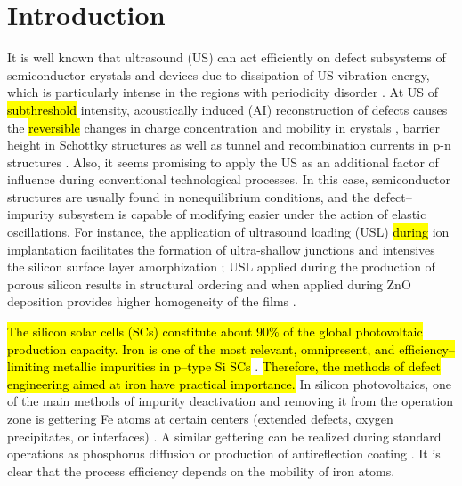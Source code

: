 \documentclass[sn-mathphys]{sn-jnl}%
\theoremstyle{thmstyleone}%
\theoremstyle{thmstyletwo}%
\theoremstyle{thmstylethree}%
\begin{document}



\maketitle

\section{Introduction}\label{sec1}

It is well known that ultrasound (US) can act efficiently on defect subsystems of semiconductor crystals and devices due to dissipation of US vibration energy, which is particularly intense in the regions with periodicity disorder \cite{ostapenko2002,Savkina2013,Olikh2018JAP}.
At US of \hl{subthreshold} intensity, acoustically induced (AI) reconstruction of defects causes the \hl{reversible} changes in charge concentration and mobility in crystals \cite{Davletova2008,Olikh2020JEM},
barrier height in Schottky structures \cite{Olikh:Ultras,OlikhJAP}
as well as tunnel and recombination currents in p-n structures \cite{Teterkin2009,Olikh2018JAP}.
Also, it seems promising to apply the US as an additional factor of influence during conventional technological processes.
In this case, semiconductor structures are usually found in  nonequilibrium conditions, and the defect--impurity subsystem is capable of modifying easier under the action of elastic oscillations.
For instance, the application of ultrasound loading (USL) \hl{during}  ion implantation facilitates
the formation of ultra-shallow junctions \cite{USImplant:JVacSci}
and intensives the silicon surface layer amorphization \cite{RomanyukSST};
USL applied during the production of porous silicon  results in structural ordering \cite{Kalem2000}
and when applied during ZnO deposition provides higher homogeneity of the films \cite{US:ZnOfilm}.

\hl{ The silicon solar cells (SCs) constitute about 90\% of the global photovoltaic production capacity.
Iron is one of the most relevant, omnipresent, and efficiency--limiting metallic impurities
in p--type Si SCs} \cite{Istratov1999,IronSC}.
\hl{ Therefore, the methods of defect engineering aimed at iron have practical importance.}
In silicon photovoltaics, one of the main methods of impurity deactivation and removing it from the operation zone is gettering Fe atoms at certain centers (extended defects, oxygen precipitates, or interfaces) \cite{LaineIEEEPV2016}.
A similar gettering can be realized during standard operations as phosphorus diffusion \cite{FeB:Vahanissi}
or production of antireflection coating  \cite{Teimuraz2014JAP}.
It is clear that the process efficiency depends on the mobility of iron atoms.
\end{document}
